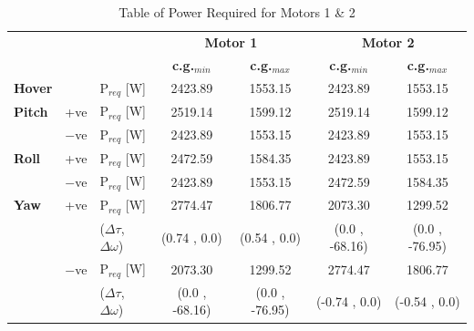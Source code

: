 \begin{table}[H]
\centering
\caption{Table of Power Required for Motors 1 \& 2}
\label{tab:powe_requ_moto_1_2}
\begin{tabular}{lll|cc|cc|}
\cline{4-7}
                           &                            &                                  & \multicolumn{2}{c|}{\textbf{Motor 1}}    & \multicolumn{2}{c|}{\textbf{Motor 2}}    \\ \cline{4-7} 
                           &                            &                                  & \textbf{c.g.$_{min}$}    & \textbf{c.g.$_{max}$}    & \textbf{c.g.$_{min}$}    & \textbf{c.g.$_{max}$}    \\ \hline
\multicolumn{1}{|l}{\textbf{Hover}} & \multicolumn{1}{l|}{}      & P$_{req}$ {[}W{]}                & 2423.89        & 1553.15        & 2423.89        & 1553.15        \\ \hline
\multicolumn{1}{|l}{\textbf{Pitch}} & \multicolumn{1}{l|}{+ve}   & P$_{req}$ {[}W{]}                & 2519.14        & 1599.12        & 2519.14        & 1599.12        \\ \hdashline
\multicolumn{1}{|l}{}      & \multicolumn{1}{l|}{$-$ve} & P$_{req}$ {[}W{]}                & 2423.89        & 1553.15        & 2423.89        & 1553.15        \\ \hline
\multicolumn{1}{|l}{\textbf{Roll}}  & \multicolumn{1}{l|}{+ve}   & P$_{req}$ {[}W{]}                & 2472.59        & 1584.35        & 2423.89        & 1553.15        \\ \hdashline
\multicolumn{1}{|l}{}      & \multicolumn{1}{l|}{$-$ve} & P$_{req}$ {[}W{]}                & 2423.89        & 1553.15        & 2472.59        & 1584.35        \\ \hline
\multicolumn{1}{|l}{\textbf{Yaw}}   & \multicolumn{1}{l|}{+ve}   & P$_{req}$ {[}W{]}                       & 2774.47        & 1806.77        & 2073.30        & 1299.52        \\ \hdashline
\multicolumn{1}{|l}{}      & \multicolumn{1}{l|}{}      & ($\Delta \tau$, $\Delta \omega$) & (0.74 , 0.0)   & (0.54 , 0.0)   & (0.0 , -68.16) & (0.0 , -76.95) \\ \hdashline
\multicolumn{1}{|l}{}      & \multicolumn{1}{l|}{$-$ve} & P$_{req}$ {[}W{]}                       & 2073.30        & 1299.52        & 2774.47        & 1806.77        \\ \hdashline
\multicolumn{1}{|l}{}      & \multicolumn{1}{l|}{}      & ($\Delta \tau$, $\Delta \omega$) & (0.0 , -68.16) & (0.0 , -76.95) & (-0.74 , 0.0)  & (-0.54 , 0.0)  \\ \hline
\end{tabular}
\end{table}


